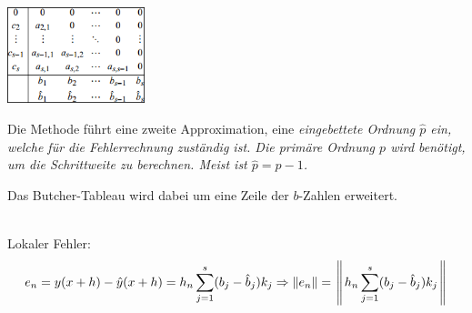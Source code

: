       \\
        \begin{minipage}{5cm}
          \includegraphics[width=4cm]{./bilder/ode_adaptive_butcher.png}
        \end{minipage}
        \begin{minipage}{13cm}
          Die Methode führt eine zweite Approximation, eine \em eingebettete Ordnung \em $\hat{p}$
          ein, welche für die Fehlerrechnung zuständig ist. Die \em primäre Ordnung \em $p$ wird
          benötigt, um die Schrittweite zu berechnen. Meist ist $\hat{p} = p-1$.

          Das Butcher-Tableau wird dabei um eine Zeile der $b$-Zahlen erweitert.
        \end{minipage}\\


        Lokaler Fehler:
        $$e_n = y(x+h) - \hat{y}(x+h) = h_n \sum\limits_{j=1}^s (b_j - \hat{b}_j)k_j \Rightarrow
        \Arrowvert e_n \Arrowvert = \left\Arrowvert h_n \sum\limits_{j=1}^s (b_j - \hat{b}_j)k_j \right\Arrowvert$$


